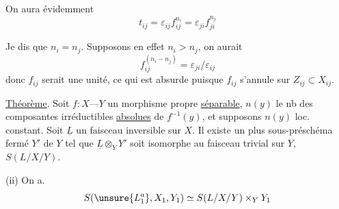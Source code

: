 On aura évidemment
\[
t_{ij}=\varepsilon_{ij}f_{ij}^{n_i}=\varepsilon_{ji}f_{ji}^{n_j}
\]

  Je dis que $n_i=n_j$. Supposons en effet $n_i>n_j$, on aurait  
\[
f_{ij}^{(n_i-n_j)}=\varepsilon_{ji}/\varepsilon_{ij}
\]
donc $f_{ij}$ serait une unité, ce qui  est absurde puisque $f_{ij}$ s'annule sur $Z_{ij}\subset X_{ij}$.

\uline{Théorème}. Soit $f:X\text{---}Y$ un morphisme propre  \uline{séparable},   $n(y)$ le nb des composantes irréductibles \uline{absolues} de $f^{-1}(y)$, et supposons $n(y)$ loc. constant. Soit $\underline L$ un faisceau inversible sur $X$.   Il existe un plus  sous-préschéma  fermé $Y'$ de $Y$ tel que $\underline L\otimes_Y Y'$ soit isomorphe au faisceau trivial sur $Y$,   $S(L/X/Y)$.

(ii) On a.
\[
S(\unsure{L_1^a},X_1,Y_1)\simeq S(L/X/Y)\times_Y Y_1
\]
